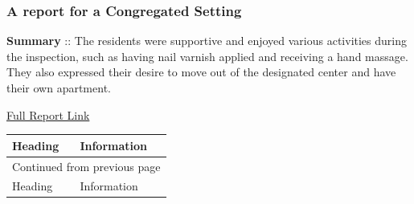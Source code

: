 \documentclass[a4paper,11pt,twoside]{article}
\begin{document}
\subsubsection{A report for a Congregated Setting}
\label{sec:org969bf0b}

\textbf{Summary} :: The residents were supportive and enjoyed various activities during the inspection, such as having nail varnish applied and receiving a hand massage. They also expressed their desire to move out of the designated center and have their own apartment.

\href{https://www.hiqa.ie/system/files?file=inspectionreports/4745-lios-mor-16-september-2020.pdf}{Full Report Link}

\begin{longtable}{p{11cm}|p{5cm}}
Heading & Information\\[0pt]
\hline
\endfirsthead
\multicolumn{2}{l}{Continued from previous page} \\[0pt]
\hline

Heading & Information \\[0pt]


\end{longtable}
\end{document}
